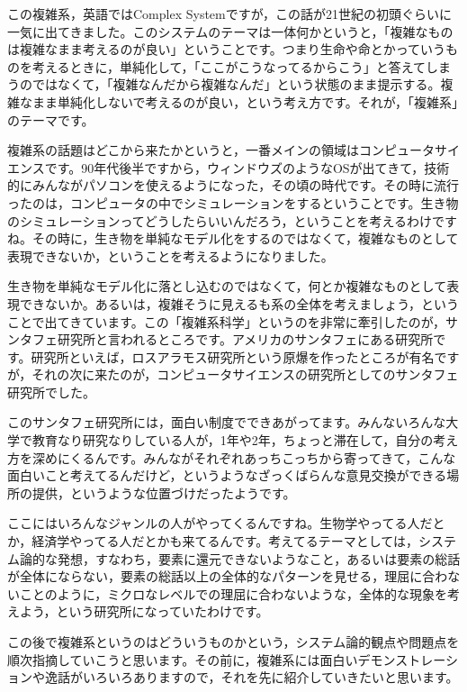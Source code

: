 \documentclass{ltjsbook}
\begin{document}
この複雑系，英語ではComplex Systemですが，この話が21世紀の初頭ぐらいに一気に出てきました。このシステムのテーマは一体何かというと，「複雑なものは複雑なまま考えるのが良い」ということです。つまり生命や命とかっていうものを考えるときに，単純化して，「ここがこうなってるからこう」と答えてしまうのではなくて，「複雑なんだから複雑なんだ」という状態のまま提示する。複雑なまま単純化しないで考えるのが良い，という考え方です。それが，「複雑系」のテーマです。

複雑系の話題はどこから来たかというと，一番メインの領域はコンピュータサイエンスです。90年代後半ですから，ウィンドウズのようなOSが出てきて，技術的にみんながパソコンを使えるようになった，その頃の時代です。その時に流行ったのは，コンピュータの中でシミュレーションをするということです。生き物のシミュレーションってどうしたらいいんだろう，ということを考えるわけですね。その時に，生き物を単純なモデル化をするのではなくて，複雑なものとして表現できないか，ということを考えるようになりました。

生き物を単純なモデル化に落とし込むのではなくて，何とか複雑なものとして表現できないか。あるいは，複雑そうに見えるも系の全体を考えましょう，ということで出てきています。この「複雑系科学」というのを非常に牽引したのが，サンタフェ研究所と言われるところです。アメリカのサンタフェにある研究所です。研究所といえば，ロスアラモス研究所という原爆を作ったところが有名ですが，それの次に来たのが，コンピュータサイエンスの研究所としてのサンタフェ研究所でした。

このサンタフェ研究所には，面白い制度でできあがってます。みんないろんな大学で教育なり研究なりしている人が，1年や2年，ちょっと滞在して，自分の考え方を深めにくるんです。みんながそれぞれあっちこっちから寄ってきて，こんな面白いこと考えてるんだけど，というようなざっくばらんな意見交換ができる場所の提供，というような位置づけだったようです。

ここにはいろんなジャンルの人がやってくるんですね。生物学やってる人だとか，経済学やってる人だとかも来てるんです。考えてるテーマとしては，システム論的な発想，すなわち，要素に還元できないようなこと，あるいは要素の総話が全体にならない，要素の総話以上の全体的なパターンを見せる，理屈に合わないことのように，ミクロなレベルでの理屈に合わないような，全体的な現象を考えよう，という研究所になっていたわけです。


この後で複雑系というのはどういうものかという，システム論的観点や問題点を順次指摘していこうと思います。その前に，複雑系には面白いデモンストレーションや逸話がいろいろありますので，それを先に紹介していきたいと思います。
\end{document}
